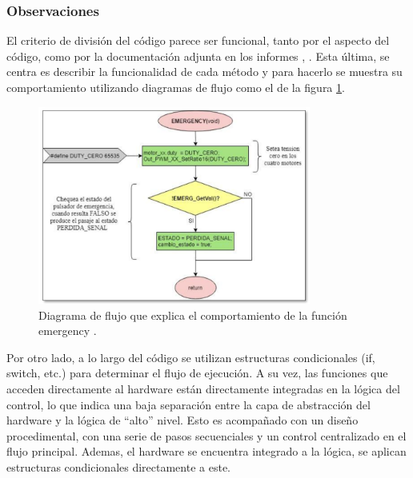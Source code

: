 \subsubsection*{Observaciones}
El criterio de división del código parece ser funcional, tanto por el aspecto del código, como por la documentación adjunta en los informes \cite[pág. 78-85]{disenioViejo1}, \cite[pág. 110-149]{disenioViejo2}. Esta última, se centra es describir la funcionalidad de cada método y para hacerlo se muestra su comportamiento utilizando diagramas de flujo como el de la figura \ref{diagra}. 

\begin{figure}[h]
\caption{Diagrama de flujo que explica el comportamiento de la función emergency \cite[pág. 82]{disenioViejo1}.}
\label{diagra}
\begin{centering}
{\includegraphics[width=0.8\textwidth]{diagramaFlujo.png}\par}
\end{centering}
\end{figure}


Por otro lado, a lo largo del código se utilizan estructuras condicionales (if, switch, etc.) para determinar el flujo de ejecución. A su vez, las funciones que acceden directamente al hardware están directamente integradas en la lógica del control, lo que indica una baja separación entre la capa de abstracción del hardware y la lógica de ``alto'' nivel. Esto es acompañado con un diseño procedimental, con una serie de pasos secuenciales y un control centralizado en el flujo principal. Ademas, el hardware se encuentra integrado a la lógica, se aplican estructuras condicionales directamente a este.

